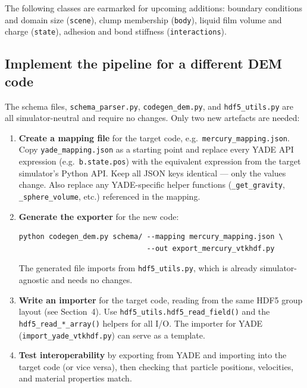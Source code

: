 \documentclass[10pt,a4paper]{article}
\begin{document}
\begin{notebox}
The following classes are earmarked for upcoming additions: boundary conditions
and domain size (\texttt{scene}), clump membership (\texttt{body}), liquid film
volume and charge (\texttt{state}), adhesion and bond stiffness
(\texttt{interactions}).
\end{notebox}

\subsection{Implement the pipeline for a different DEM code}

The schema files, \texttt{schema\_parser.py}, \texttt{codegen\_dem.py}, and
\texttt{hdf5\_utils.py} are all simulator-neutral and require no changes.
Only two new artefacts are needed:

\begin{enumerate}[leftmargin=1.6em, itemsep=2pt, topsep=2pt]
  \item \textbf{Create a mapping file} for the target code, e.g.\
    \texttt{mercury\_mapping.json}. Copy \texttt{yade\_mapping.json} as a
    starting point and replace every YADE API expression (e.g.\
    \texttt{b.state.pos}) with the equivalent expression from the target
    simulator's Python API. Keep all JSON keys identical — only the values
    change. Also replace any YADE-specific helper functions
    (\texttt{\_get\_gravity}, \texttt{\_sphere\_volume}, etc.) referenced in
    the mapping.

  \item \textbf{Generate the exporter} for the new code:
\begin{lstlisting}[style=sh]
python codegen_dem.py schema/ --mapping mercury_mapping.json \
                              --out export_mercury_vtkhdf.py
\end{lstlisting}
    The generated file imports from \texttt{hdf5\_utils.py}, which is already
    simulator-agnostic and needs no changes.

  \item \textbf{Write an importer} for the target code, reading from the same
    HDF5 group layout (see Section~4). Use \texttt{hdf5\_utils.hdf5\_read\_field()}
    and the \texttt{hdf5\_read\_*\_array()} helpers for all I/O. The importer
    for YADE (\texttt{import\_yade\_vtkhdf.py}) can serve as a template.

  \item \textbf{Test interoperability} by exporting from YADE and importing into
    the target code (or vice versa), then checking that particle positions,
    velocities, and material properties match.
\end{enumerate}
\end{document}
